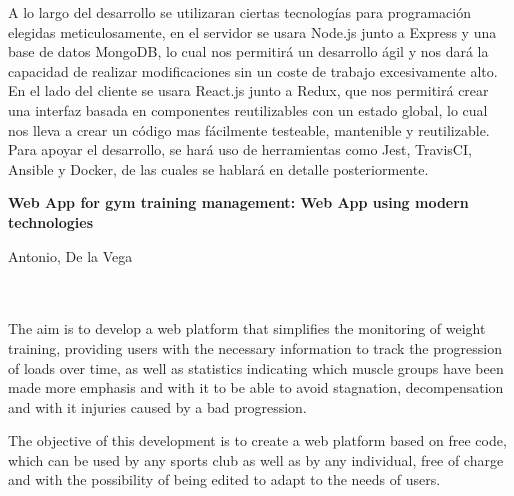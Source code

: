 A lo largo del desarrollo se utilizaran ciertas tecnologías para programación elegidas meticulosamente, en el servidor se usara Node.js junto a Express y una base de datos MongoDB, lo cual nos permitirá un desarrollo ágil y nos dará la capacidad de realizar modificaciones sin un coste de trabajo excesivamente alto. En el lado del cliente se usara React.js junto a Redux, que nos permitirá crear una interfaz basada en componentes reutilizables con un estado global, lo cual nos lleva a crear un código mas fácilmente testeable, mantenible y reutilizable. Para apoyar el desarrollo, se hará uso de herramientas como Jest, TravisCI, Ansible y Docker, de las cuales se hablará en detalle posteriormente.

\cleardoublepage


\thispagestyle{empty}


\begin{center}
{\large\bfseries Web App for gym training management: Web App using modern technologies}\\
\end{center}
\begin{center}
Antonio, De la Vega\\
\end{center}

\\

\vspace{0.7cm}
\\

The aim is to develop a web platform that simplifies the monitoring of weight training, providing users with the necessary information to track the progression of loads over time, as well as statistics indicating which muscle groups have been made more emphasis and with it to be able to avoid stagnation, decompensation and with it injuries caused by a bad progression.

The objective of this development is to create a web platform based on free code, which can be used by any sports club as well as by any individual, free of charge and with the possibility of being edited to adapt to the needs of users.

\chapter*{}
\thispagestyle{empty}

